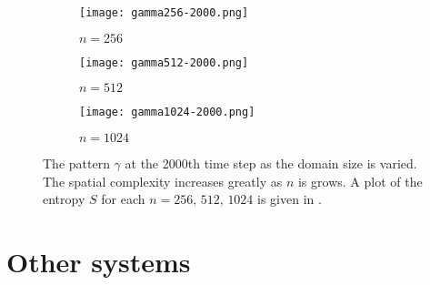 %
\begin{figure}[h]
	\centering
	\begin{subfigure}[b]{0.3\textwidth}
		\texttt{[image: gamma256-2000.png]}
		\caption{$n = 256$} \label{fig:gamma256-1000}
	\end{subfigure} \quad
	\begin{subfigure}[b]{0.3\textwidth}
		\texttt{[image: gamma512-2000.png]}
		\caption{$n = 512$} \label{fig:gamma512-1000}
	\end{subfigure} \quad
	\begin{subfigure}[b]{0.3\textwidth}
		\texttt{[image: gamma1024-2000.png]}
		\caption{$n = 1024$} \label{fig:gamma1024-1000}
	\end{subfigure}
	\caption{The pattern $\gamma$ at the 2000th time step as the domain size is varied. The spatial complexity increases greatly as $n$ is grows. A plot of the entropy $S$ for each $n = 256,\, 512,\, 1024$ is given in .} \label{fig:gamma_domain}
\end{figure}

\section{Other systems}

